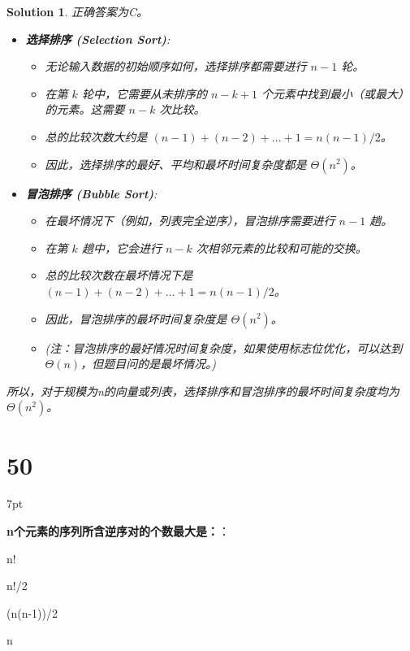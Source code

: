 \documentclass[UTF8]{report}
\newtheorem{solution}{Solution}
\theoremstyle{MyLineTheoremStyle} %
\theoremstyle{MyBlockTheoremStyle} %
\theoremstyle{MySubsubsectionStyle} %
\newenvironment{graybox}{%
        \def\FrameCommand{%
        \hspace{1pt}%
        {\color{gray}\small \vrule width 2pt}%
        {\color{graybox_color}\vrule width 4pt}%
        \colorbox{graybox_color}%
        }%
        \MakeFramed{\advance\hsize-\width\FrameRestore}%
        \noindent\hspace{-4.55pt}%
        \begin{adjustwidth}{}{7pt}%
        \vspace{2pt}\vspace{2pt}%
        }
        {%
        \vspace{2pt}\end{adjustwidth}\endMakeFramed%
        }
\begin{document}
\begin{solution}
正确答案为C。

\begin{itemize}
    \item \textbf{选择排序 (Selection Sort)}:
    \begin{itemize}
        \item 无论输入数据的初始顺序如何，选择排序都需要进行 $n-1$ 轮。
        \item 在第 $k$ 轮中，它需要从未排序的 $n-k+1$ 个元素中找到最小（或最大）的元素。这需要 $n-k$ 次比较。
        \item 总的比较次数大约是 $(n-1) + (n-2) + \ldots + 1 = n(n-1)/2$。
        \item 因此，选择排序的最好、平均和最坏时间复杂度都是 $\Theta(n^2)$。
    \end{itemize}

    \item \textbf{冒泡排序 (Bubble Sort)}:
    \begin{itemize}
        \item 在最坏情况下（例如，列表完全逆序），冒泡排序需要进行 $n-1$ 趟。
        \item 在第 $k$ 趟中，它会进行 $n-k$ 次相邻元素的比较和可能的交换。
        \item 总的比较次数在最坏情况下是 $(n-1) + (n-2) + \ldots + 1 = n(n-1)/2$。
        \item 因此，冒泡排序的最坏时间复杂度是 $\Theta(n^2)$。
        \item (注：冒泡排序的最好情况时间复杂度，如果使用标志位优化，可以达到 $\Theta(n)$，但题目问的是最坏情况。)
    \end{itemize}
\end{itemize}
所以，对于规模为n的向量或列表，选择排序和冒泡排序的最坏时间复杂度均为 $\Theta(n^2)$。
\end{solution}

\section*{50}

\begin{graybox}
\textbf{n个元素的序列所含逆序对的个数最大是：}：
\begin{circledenum}
    \item n!
    \item n!/2
    \item (n(n-1))/2
    \item n
\end{circledenum}
\end{graybox}
\end{document}
